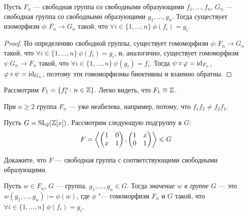 \begin{theorem}
	Пусть $F_n$ --- свободная группа со свободными образующими $f_1, \ldots, f_n$, $G_n$ --- свободная группа со свободными образующими $g_1, \ldots, g_n$. Тогда существует изоморфизм $\phi \colon F_n \to G_n$ такой, что $\forall i \in \{1, \ldots, n\}\ \phi(f_i) = g_i$.
\end{theorem}

\begin{proof}
	По определению свободной группы, существует гомоморфизм $\phi: F_n \to G_n$ такой, что $\forall i \in \{1, \ldots, n\}\ \phi(f_i) = g_i$, и, аналогично, существует гомоморфизм $\psi\ G_n \to F_n$ такой, что $\forall i \in \{1, \ldots, n\}\ \psi(g_i) = f_i$. Тогда $\psi \circ \varphi = \operatorname{id}_{F_n}$, $\varphi \circ \psi = \operatorname{id}_{G_n}$, поэтому эти гомоморфизмы биективны и взаимно обратны.
\end{proof}

\begin{example}
	Рассмотрим $F_1 = \{f_1^n \colon n \in \mathbb{Z}\}$. Легко видеть, что $F_1 \cong \mathbb{Z}$.
\end{example}

\begin{note}
	При $n \ge 2$ группа $F_n$ --- уже неабелева, например, потому, что $f_1f_2 \ne f_2f_1$.
\end{note}

\begin{exercise}
	Пусть $G = \operatorname{SL}_2(\mathbb{Z}[x])$. Рассмотрим следующую подгруппу в $G$:
	\[
		F = \left\langle 
		\begin{pmatrix}
			1&0
			\\
			x&1
		\end{pmatrix},
		\begin{pmatrix}
			1&x
			\\
			0&1
		\end{pmatrix} \right\rangle \leqslant G
	\]
	
	Докажите, что $F$ --- свободная группа с соответствующими свободными образующими.
\end{exercise}

\begin{definition}
	Пусть $w \in F_n$, $G$ --- группа, $g_1, \ldots, g_n \in G$. Тогда \textit{значение $w$ в группе $G$} --- это $w(g_1, \ldots, g_n) := \phi(w)$, где $\phi$ "--- гомоморфизм $F_n$ и $G$ такой, что $\forall i \in \{1, \ldots, n\}\ \phi(f_i) = g_i$.
\end{definition}